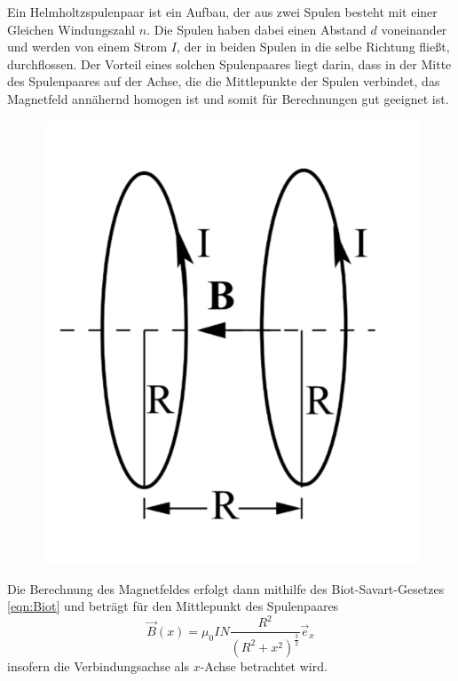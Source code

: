 \noindent Ein Helmholtzspulenpaar ist ein Aufbau, der aus zwei Spulen besteht mit einer Gleichen Windungszahl $n$. Die Spulen
haben dabei einen Abstand $d$ voneinander und werden von einem Strom $I$, der in beiden Spulen in die selbe Richtung fließt, 
durchflossen. Der Vorteil eines solchen Spulenpaares liegt darin,
dass  in der Mitte des Spulenpaares auf der Achse, die die Mittlepunkte der Spulen verbindet, das Magnetfeld annähernd homogen 
ist und somit für Berechnungen gut geeignet ist.
\begin{figure}[H]
    \centering
    \includegraphics{Bilder/Helmholtz.png}
    \label{fig:helm}
\end{figure}
\noindent Die Berechnung des Magnetfeldes erfolgt dann mithilfe des Biot-Savart-Gesetzes \ref{eqn:Biot} und beträgt für den 
Mittlepunkt des Spulenpaares
\begin{equation}
    \vec{B}(x)=\mu_0IN \frac{R^2}{(R^2+x^2)^\frac{3}{2}}\vec{e}_x
    \label{eqn:magfeld}
\end{equation}
insofern die Verbindungsachse als $x$-Achse betrachtet wird. \\


